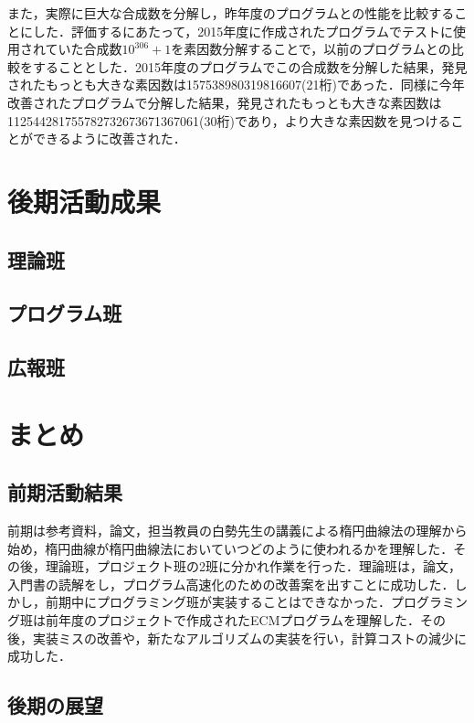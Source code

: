 \documentclass[openany,11pt,papersize]{jsbook}
\begin{document}
{また，実際に巨大な合成数を分解し，昨年度のプログラムとの性能を比較することにした．評価するにあたって，2015年度に作成されたプログラムでテストに使用されていた合成数$10^{306}+1$を素因数分解することで，以前のプログラムとの比較をすることとした．2015年度のプログラムでこの合成数を分解した結果，発見されたもっとも大きな素因数は157538980319816607(21桁)であった．同様に今年改善されたプログラムで分解した結果，発見されたもっとも大きな素因数は112544281755782732673671367061(30桁)であり，より大きな素因数を見つけることができるように改善された．


\chapter{後期活動成果}
\section{理論班}

\section{プログラム班}

\section{広報班}

\chapter{まとめ}

\section{前期活動結果}

前期は参考資料，論文，担当教員の白勢先生の講義による楕円曲線法の理解から始め，楕円曲線が楕円曲線法においていつどのように使われるかを理解した．その後，理論班，プロジェクト班の2班に分かれ作業を行った．理論班は，論文，入門書の読解をし，プログラム高速化のための改善案を出すことに成功した．しかし，前期中にプログラミング班が実装することはできなかった．プログラミング班は前年度のプロジェクトで作成されたECMプログラムを理解した．その後，実装ミスの改善や，新たなアルゴリズムの実装を行い，計算コストの減少に成功した．


\section{後期の展望}

}
\end{document}
